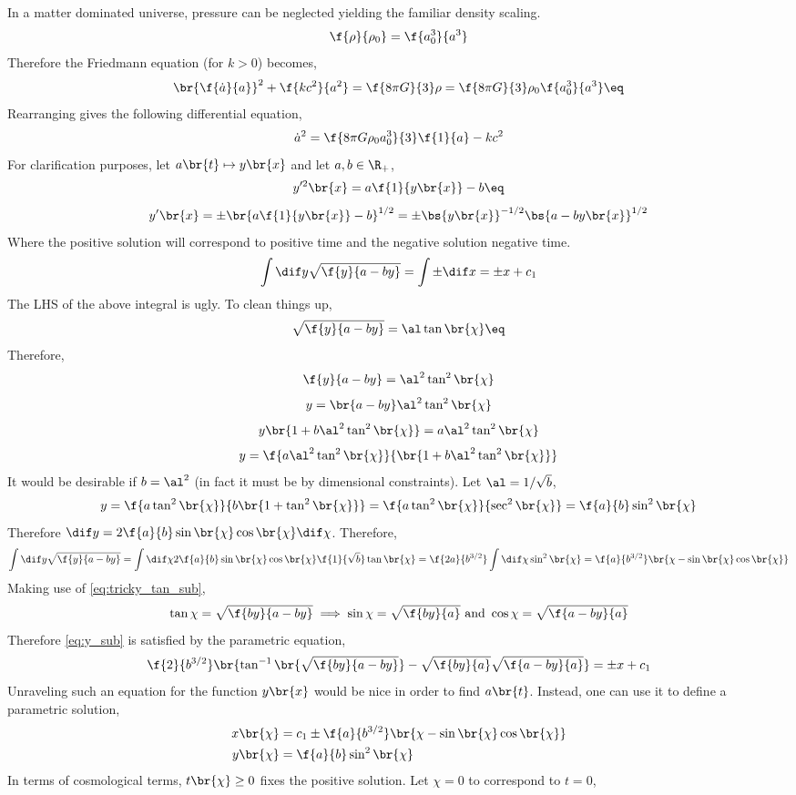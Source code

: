 \documentclass{article}
\begin{document}
In a matter dominated universe, pressure can be neglected yielding the familiar density scaling.
\[ \f{\rho}{\rho_0} = \f{a_0^3}{a^3} \]
Therefore the Friedmann equation (for $k >0$) becomes,
\[ \br{\f{\dot a}{a}}^2 + \f{kc^2}{a^2} = \f{8 \pi G}{3} \rho = \f{8 \pi G}{3} \rho_0\f{a_0^3}{a^3} \eq \label{eq:friedmann2}\]
Rearranging gives the following differential equation,
\[ \dot a^2  = \f{8 \pi G\rho_0a_0^3}{3} \f{1}{a} - kc^2 \]
For clarification purposes, let $a\br{t} \mapsto y\br{x}$ and let $a,b \in \R_{+}$,
\[ y'^2\br{x} = a \f{1}{y\br{x}} - b \eq \label{eq:y_sub}\]
\[ y'\br{x} = \pm\br{a \f{1}{y\br{x}} - b}^{1/2} = \pm\bs{y\br{x}}^{-1/2}\bs{a - b y\br{x}}^{1/2} \]
Where the positive solution will correspond to positive time and the negative solution negative time.
\[ \int \dif y \sqrt{\f{y}{a - b y}} = \int \pm \dif x = \pm x + c_1  \]
The LHS of the above integral is ugly. To clean things up,
\[ \sqrt{\f{y}{a - b y}} = \al \tan \br{\chi} \eq \label{eq:tricky_tan_sub}\]
Therefore,
\[ \f{y}{a - b y} = \al^2 \tan^2 \br{\chi} \]
\[ y = \br{a - b y}\al^2 \tan^2 \br{\chi} \]
\[ y\br{1 + b\al^2 \tan^2 \br{\chi}} = a\al^2 \tan^2 \br{\chi} \]
\[ y = \f{a\al^2 \tan^2 \br{\chi}}{\br{1 + b\al^2 \tan^2 \br{\chi}}} \]
It would be desirable if $b = \al^2$ (in fact it must be by dimensional constraints). Let $\al = 1/\sqrt{b}$,
\[ y = \f{a \tan^2 \br{\chi}}{b\br{1 + \tan^2 \br{\chi}}} = \f{a\tan^2 \br{\chi}}{\sec^2 \br{\chi}} = \f{a}{b} \sin^2\br{\chi} \]
Therefore $\dif y = 2\f{a}{b} \sin\br{\chi}\cos\br{\chi} \dif \chi$. Therefore,
\[  \int \dif y \sqrt{\f{y}{a - b y}} = \int \dif \chi 2\f{a}{b} \sin\br{\chi}\cos\br{\chi} \f{1}{\sqrt{b}} \tan \br{\chi} = \f{2a}{b^{3/2}}\int \dif \chi \sin^2\br{\chi} = \f{a}{b^{3/2}} \br{\chi - \sin\br{\chi}\cos\br{\chi}} \]
Making use of \cref{eq:tricky_tan_sub},
\[ \tan \chi = \sqrt{\f{by}{a - b y}} \implies \sin \chi = \sqrt{\f{by}{a}} \text{ and } \cos \chi = \sqrt{\f{a - by}{a}} \]
Therefore \cref{eq:y_sub} is satisfied by the parametric equation,
\[ \f{2}{b^{3/2}} \br{\tan^{-1}\br{\sqrt{\f{by}{a - b y}}} - \sqrt{\f{by}{a}}\sqrt{\f{a - by}{a}}} = \pm x + c_1 \]
Unraveling such an equation for the function $y\br{x}$ would be nice in order to find $a\br{t}$. Instead, one can use it to define a parametric solution,
\begin{align*}
x\br{\chi} &= c_1 \pm \f{a}{b^{3/2}} \br{\chi - \sin\br{\chi}\cos\br{\chi}}  \\
y\br{\chi} &= \f{a}{b} \sin^2\br{\chi}
\end{align*}
In terms of cosmological terms, $t\br{\chi} \geq 0$ fixes the positive solution. Let $\chi = 0$ to correspond to $t = 0$,
\end{document}
